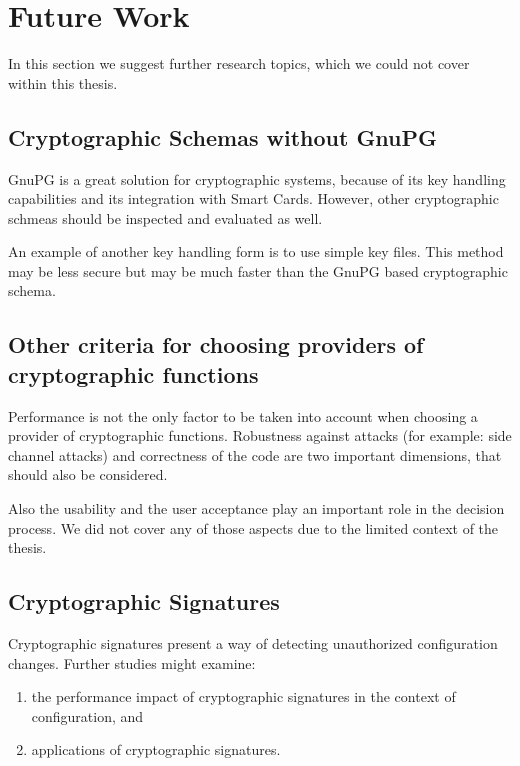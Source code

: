 %

\section{Future Work}

In this section we suggest further research topics, which we could not cover within this thesis.

	\subsection{Cryptographic Schemas without GnuPG}

GnuPG is a great solution for cryptographic systems, because of its key handling capabilities and its integration with Smart Cards.
However, other cryptographic schmeas should be inspected and evaluated as well.

An example of another key handling form is to use simple key files.
This method may be less secure but may be much faster than the GnuPG based cryptographic schema.

	\subsection{Other criteria for choosing providers of cryptographic functions}

Performance is not the only factor to be taken into account when choosing a provider of cryptographic functions.
Robustness against attacks (for example: side channel attacks) and correctness of the code are two important dimensions, that should also be considered.

Also the usability and the user acceptance play an important role in the decision process.
We did not cover any of those aspects due to the limited context of the thesis.

	\subsection{Cryptographic Signatures}

Cryptographic signatures present a way of detecting unauthorized configuration changes.\cite{bruceschneier1996}
Further studies might examine:
\begin{enumerate}
\item the performance impact of cryptographic signatures in the context of configuration, and
\item applications of cryptographic signatures.
\end{enumerate}

